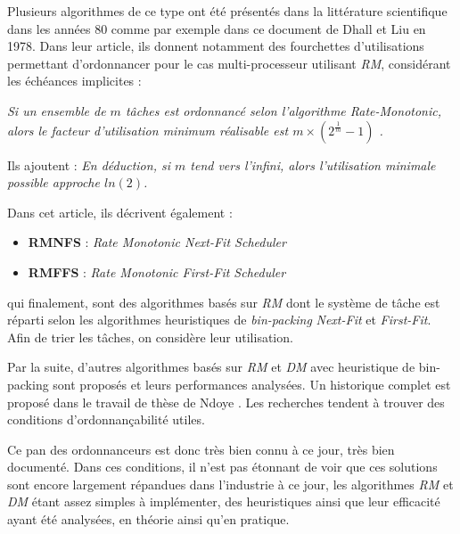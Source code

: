 	Plusieurs algorithmes de ce type ont été présentés dans la littérature scientifique
	dans les années 80 comme par exemple \cite{dhall_real-time_1978} dans ce 
	document de Dhall et Liu en 1978. 
	Dans leur article, ils donnent notamment des fourchettes d'utilisations 
	permettant d'ordonnancer pour le cas multi-processeur utilisant \textit{RM}, 
	considérant les échéances implicites :
	\begin{mytheorem}
		\textit{\og Si un ensemble de $m$ tâches est ordonnancé selon l'algorithme \textit{Rate-Monotonic}, 
			alors le facteur d'utilisation minimum réalisable est $m\times(2^{\frac{1}{m}} - 1)$\fg{} .}
	\end{mytheorem}

	Ils ajoutent :\newline
	\textit{En déduction, si $m$ tend vers l'infini, alors l'utilisation minimale possible approche $ln(2)$.}
	
	Dans cet article, ils décrivent également :\medskip
	\begin{itemize}
		\item \textbf{RMNFS} : \textit{Rate Monotonic Next-Fit Scheduler}
		\item \textbf{RMFFS} : \textit{Rate Monotonic First-Fit Scheduler}
	\end{itemize}
	\vspace{1em}
	qui finalement, sont des algorithmes basés sur \textit{RM} dont le système de tâche est 
	réparti selon les algorithmes heuristiques de \textit{bin-packing} \textit{Next-Fit} et \textit{First-Fit}. 
	Afin de trier les tâches, on considère leur utilisation.
	
	Par la suite, d'autres algorithmes basés sur \textit{RM} et \textit{DM} avec 
	heuristique de bin-packing sont proposés et leurs performances analysées. 
	Un historique complet est proposé dans le travail de thèse de Ndoye \cite{ndoye_ordonnancement_2014}. 
	Les recherches tendent à trouver des conditions d'ordonnançabilité utiles.\medskip
	
	Ce pan des ordonnanceurs est donc très bien connu à ce jour, très bien documenté. 
	Dans ces conditions, il n'est pas étonnant de voir que ces solutions sont encore largement 
	répandues dans l'industrie à ce jour, les algorithmes \textit{RM} et \textit{DM} 
	étant assez simples à implémenter, des heuristiques ainsi que leur efficacité ayant été analysées, en théorie ainsi qu'en pratique.\medskip
	
